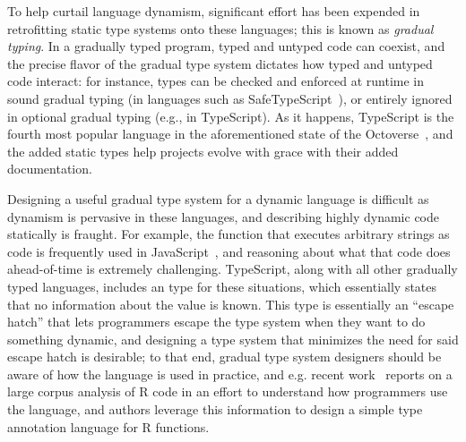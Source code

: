 \documentclass[sigplan,anonymous,review]{acmart}
\begin{document}
To help curtail language dynamism, significant effort has been expended in retrofitting static type systems onto these languages; this is known as \textit{gradual typing}.
In a gradually typed program, typed and untyped code can coexist, and the precise flavor of the gradual type system dictates how typed and untyped code interact: for instance, types can be checked and enforced at runtime in sound gradual typing (in languages such as SafeTypeScript~\cite{rastogi2015safe}), or entirely ignored in optional gradual typing (e.g., in TypeScript).
As it happens, TypeScript is the fourth most popular language in the aforementioned state of the Octoverse~\cite{state-of-octoverse-2021}, and the added static types help projects evolve with grace with their added documentation.

Designing a useful gradual type system for a dynamic language is difficult as dynamism is pervasive in these languages, and describing highly dynamic code statically is fraught.
For example, the  function that executes arbitrary strings as code is frequently used in JavaScript~\cite{richards2011eval}, and reasoning about what that code does ahead-of-time is extremely challenging.
TypeScript, along with all other gradually typed languages, includes an  type for these situations, which essentially states that no information about the value is known.
This  type is essentially an ``escape hatch'' that lets programmers escape the type system when they want to do something dynamic, and designing a type system that minimizes the need for said escape hatch is desirable; to that end, gradual type system designers should be aware of how the language is used in practice, and e.g. recent work~\cite{turcotte2020designing} reports on a large corpus analysis of R code in an effort to understand how programmers use the language, and authors leverage this information to design a simple type annotation language for R functions.
\end{document}
